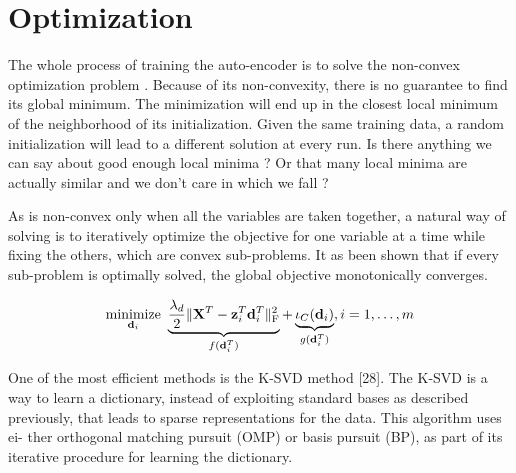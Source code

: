 

\chapter{Optimization} \label{chap:optimization}

The whole process of training the auto-encoder is to solve the non-convex optimization problem . Because of its non-convexity, there is no guarantee to find its global minimum. The minimization will end up in the closest local minimum of the neighborhood of its initialization. Given the same training data, a random initialization will lead to a different solution at every run.
{\color{red} Is there anything we can say about good enough local minima ? Or that many local minima are actually similar and we don't care in which we fall ?}



As  is non-convex only when all the variables are taken together, a natural way of solving is to iteratively optimize the objective for one variable at a time while fixing the others, which are convex sub-problems. {\color{red}It as been shown that if every sub-problem is optimally solved, the global objective monotonically converges.}

\begin{equation}
	\operatorname*{minimize}\limits_{\mathbf{d}_i} \  \underbrace{\frac{\lambda_d}{2} \| \mathbf{X}^T - \mathbf{z}_i^T \mathbf{d}_i^T \|_\text{F}^2}_{f(\mathbf{d}_i^T)} + \underbrace{\iota_C(\mathbf{d}_i)}_{g(\mathbf{d}_i^T)} , i = 1, \ldots, m
\end{equation}



One of the most efficient methods is the K-SVD method [28]. The K-SVD is a way to learn a dictionary, instead of exploiting standard bases as described previously, that leads to sparse representations for the data. This algorithm uses ei- ther orthogonal matching pursuit (OMP) or basis pursuit (BP), as part of its iterative procedure for learning the dictionary.

